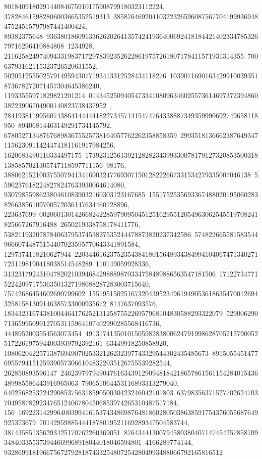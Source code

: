 {{{801840918029144084675910175908799180323112224, 378284615982806003665352519313\
3858764692041032232659608756770419993694847524515797987441400424, 89382375648\
93638018609133626202641357424193640069241818442140233478532679716296410884808\
1234928, 21162582497409433198371729783923526228619757261807178411571931314355\
70063793162115323726520631552, 5020512555025791495943077193413312528434118276\
1039071690163429910039351873678272071457304645386240, 11933555971829821201214\
01434525094054733410809634602557361469737239486038223906704900140823738437952\
, 284193811995607438641444441822734571415474764338887349359990692749658118950\
89406814463149291734145792, 6780527134876768983675525738164057762262358858359\
29935181366623876493471156230911424474181161917984256, 1620683490110334497175\
17392312561392128282343993300781791273208535003181385857021305747118597711156\
98176, 3880621521003755079413416903247769307150128222667331534279335007046138\
55962376182248278247633930064614080, 9307985598623804610839032160303123167685\
155175253569336748802019506028382663856109700572036147634460128896, 223637699\
00206013014266824228597909504512516295512054963062545519708241825667267916488\
2650219338758178411776, 53821193207878406379537453827535244478873820237342586\
57482266558158354496660744875154407023595770643341891584, 1297374118210627944\
22034461623752354384180156489343849941040674713402717231198190418038514548289\
110149059928336, 313231792431047820210394684298889870334758489886563547181506\
1712273477152242097175363501327198688287283003715640, 75742686454602690799602\
15519515025167320439523496194905361863547001269432581581309146385733000935672\
8147637093576, 18343231674381004464176252131258755226957968104830588293322079\
52900629071365995099127053115964107402990285568416736, 4448952003554563073454\
49131741350101505982838006247919986287052157900525172261975944003939792392161\
63449918250858920, 1080620422571387694907025332126232397743329544302435485673\
891505545147769557941512593905730661048322035126755539282544, 262850893596147\
24623979794904761634391290948184218657861561154284015436489985586443916965063\
790651064453116893313279040, 640256825322429085375631859050030423246042101803\
637983563715277026247037049587829234765124067804506853974265310487517184, 156\
16922314299640039941615374348698764818602805038638591754376055687649925373679\
701429598854441878019521169289347504583744, 381435851356293425170762260369051\
87643441300794580380407147454257858709348403355373944669968918044018046594801\
4166289774144, 93286991819667567279281874332548072542804993488066792165816512\
}}}
